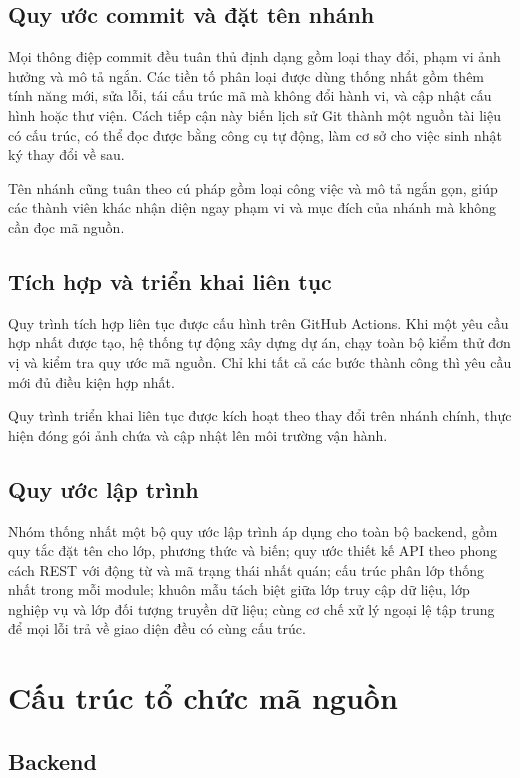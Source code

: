 \documentclass[12pt,a4paper,oneside]{report}
\begin{document}
\subsection{Quy ước commit và đặt tên nhánh}

Mọi thông điệp commit đều tuân thủ định dạng gồm loại thay đổi, phạm vi ảnh hưởng và mô tả ngắn. Các tiền tố phân loại được dùng thống nhất gồm thêm tính năng mới, sửa lỗi, tái cấu trúc mã mà không đổi hành vi, và cập nhật cấu hình hoặc thư viện. Cách tiếp cận này biến lịch sử Git thành một nguồn tài liệu có cấu trúc, có thể đọc được bằng công cụ tự động, làm cơ sở cho việc sinh nhật ký thay đổi về sau.

Tên nhánh cũng tuân theo cú pháp gồm loại công việc và mô tả ngắn gọn, giúp các thành viên khác nhận diện ngay phạm vi và mục đích của nhánh mà không cần đọc mã nguồn.

\subsection{Tích hợp và triển khai liên tục}

Quy trình tích hợp liên tục được cấu hình trên GitHub Actions. Khi một yêu cầu hợp nhất được tạo, hệ thống tự động xây dựng dự án, chạy toàn bộ kiểm thử đơn vị và kiểm tra quy ước mã nguồn. Chỉ khi tất cả các bước thành công thì yêu cầu mới đủ điều kiện hợp nhất.

Quy trình triển khai liên tục được kích hoạt theo thay đổi trên nhánh chính, thực hiện đóng gói ảnh chứa và cập nhật lên môi trường vận hành.

\subsection{Quy ước lập trình}

Nhóm thống nhất một bộ quy ước lập trình áp dụng cho toàn bộ backend, gồm quy tắc đặt tên cho lớp, phương thức và biến; quy ước thiết kế API theo phong cách REST với động từ và mã trạng thái nhất quán; cấu trúc phân lớp thống nhất trong mỗi module; khuôn mẫu tách biệt giữa lớp truy cập dữ liệu, lớp nghiệp vụ và lớp đối tượng truyền dữ liệu; cùng cơ chế xử lý ngoại lệ tập trung để mọi lỗi trả về giao diện đều có cùng cấu trúc.

\section{Cấu trúc tổ chức mã nguồn}

\subsection{Backend}
\end{document}
